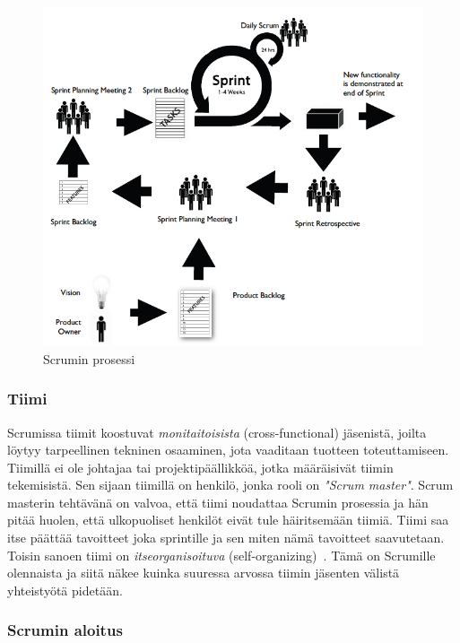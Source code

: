 \documentclass[finnish]{../tktltiki2}
\theoremstyle{definition}
\theoremstyle{remark}
\begin{document}
\begin{figure}[h]
     \includegraphics{scrum.png}
     \caption{Scrumin prosessi~\cite{ScrumHandBook}}\label{scrumprocess}
\end{figure}

\subsubsection{Tiimi}

Scrumissa tiimit koostuvat \emph{monitaitoisista} (cross-functional) 
jäsenistä, joilta löytyy tarpeellinen tekninen osaaminen, jota 
vaaditaan
tuotteen toteuttamiseen. Tiimillä ei ole johtajaa tai 
projektipäällikköä, jotka määräisivät tiimin tekemisistä. Sen sijaan tiimillä on henkilö, jonka rooli on \emph{"Scrum master"}. Scrum masterin tehtävänä on valvoa, että tiimi noudattaa Scrumin prosessia ja hän pitää huolen, että ulkopuoliset henkilöt eivät tule häiritsemään tiimiä.
Tiimi saa itse päättää tavoitteet joka sprintille ja sen miten nämä tavoitteet 
saavutetaan. Toisin sanoen tiimi on \emph{itseorganisoituva}
(self-organizing)~\cite{ScrumHandBook}. Tämä on Scrumille olennaista ja siitä näkee 
kuinka suuressa arvossa tiimin jäsenten välistä yhteistyötä 
pidetään.

\subsubsection{Scrumin aloitus}
\end{document}
